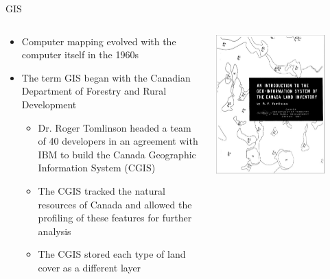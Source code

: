 \documentclass[show notes, aspectratio=1610]{beamer}
\begin{document}
\begin{frame}{GIS}{}
	\begin{columns}
		\begin{column}{0.5\textwidth}
			\begin{itemize}
				\item
				      Computer mapping evolved with the computer itself in the 1960s
				\item
				      The term GIS began with the Canadian Department of Forestry
				      and Rural Development
				      \begin{itemize}
					      \item
					            Dr. Roger Tomlinson headed a team of 40
					            developers in an agreement with IBM to build the
					            Canada Geographic Information System (CGIS)
					      \item
					            The CGIS tracked the natural resources of Canada
					            and allowed the profiling of these features for further
					            analysis
					      \item
					            The CGIS stored each type of land cover as a different
					            layer
				      \end{itemize}
			\end{itemize}
		\end{column}
		\begin{column}{0.5\textwidth}
			\centering
			\includegraphics[width=0.8\textwidth]{images/canada_gis.jpeg}
		\end{column}
	\end{columns}
\end{frame}
\end{document}
